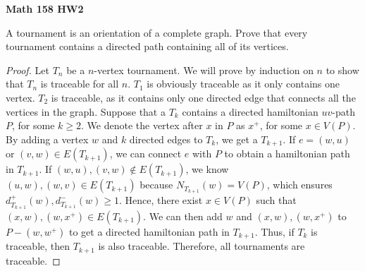 \documentclass{article}
\newenvironment{problem}[2][Question]{\begin{trivlist}
\item[\hskip \labelsep {\bfseries #1}\hskip \labelsep {\bfseries #2.}]}{\end{trivlist}}
\begin{document}
 

\textbf{Math 158 HW2}

\begin{problem}{2.5.2}
    A tournament is an orientation of a complete graph. Prove that every tournament contains a directed path containing all of its vertices.
\end{problem}
\begin{proof}
    Let $T_n$ be a $n$-vertex tournament. We will prove by induction on $n$ to show that $T_n$ is traceable for all $n$. $T_1$ is obviously traceable as it only contains one vertex. $T_2$ is traceable, as it contains only one directed edge that connects all the vertices in the graph. Suppose that a $T_k$ contains a directed hamiltonian $uv$-path $P$, for some $k \geq 2$. We denote the vertex after $x$ in $P$ as $x^+$, for some $x \in V(P)$. By adding a vertex $w$ and $k$ directed edges to $T_k$, we get a $T_{k+1}$. If $e = (w, u)$ or $(v, w) \in E(T_{k+1})$, we can connect $e$ with $P$ to obtain a hamiltonian path in $T_{k+1}$. If $(w, u), (v, w) \notin E(T_{k+1})$, we know $(u, w), (w, v) \in E(T_{k+1})$ because $N_{T_{k+1}}(w) = V(P)$, which ensures $d_{T_{k+1}}^+(w), d_{T_{k+1}}^-(w) \geq 1$. Hence, there exist $x \in V(P)$ such that $(x, w), (w, x^+) \in E(T_{k+1})$. We can then add $w$ and $(x, w), (w, x^+)$ to $P - (w, w^+)$ to get a directed hamiltonian path in $T_{k+1}$. Thus, if $T_k$ is traceable, then $T_{k+1}$ is also traceable. Therefore, all tournaments are traceable.
\end{proof}

\newpage
\end{document}
